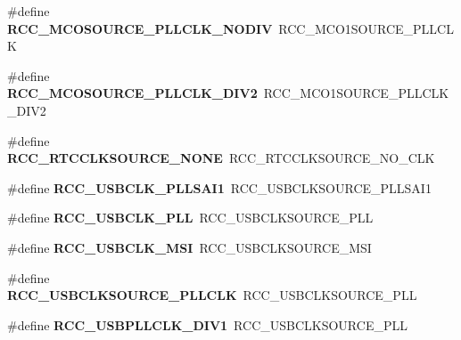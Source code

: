 \begin{DoxyCompactItemize}
\#define {\bfseries R\+C\+C\+\_\+\+M\+C\+O\+S\+O\+U\+R\+C\+E\+\_\+\+P\+L\+L\+C\+L\+K\+\_\+\+N\+O\+D\+IV}~R\+C\+C\+\_\+\+M\+C\+O1\+S\+O\+U\+R\+C\+E\+\_\+\+P\+L\+L\+C\+LK
\item 
\mbox{\label{group___h_a_l___r_c_c___aliased_ga0c689edb9d017b7498258d5e9a9cf5f6}} 
\#define {\bfseries R\+C\+C\+\_\+\+M\+C\+O\+S\+O\+U\+R\+C\+E\+\_\+\+P\+L\+L\+C\+L\+K\+\_\+\+D\+I\+V2}~R\+C\+C\+\_\+\+M\+C\+O1\+S\+O\+U\+R\+C\+E\+\_\+\+P\+L\+L\+C\+L\+K\+\_\+\+D\+I\+V2
\item 
\mbox{\label{group___h_a_l___r_c_c___aliased_ga7ac4762e5f4ebe4a04aea58edc9c46a9}} 
\#define {\bfseries R\+C\+C\+\_\+\+R\+T\+C\+C\+L\+K\+S\+O\+U\+R\+C\+E\+\_\+\+N\+O\+NE}~R\+C\+C\+\_\+\+R\+T\+C\+C\+L\+K\+S\+O\+U\+R\+C\+E\+\_\+\+N\+O\+\_\+\+C\+LK
\item 
\mbox{\label{group___h_a_l___r_c_c___aliased_gad3aae66d6569b04d04517ea523ce6e9e}} 
\#define {\bfseries R\+C\+C\+\_\+\+U\+S\+B\+C\+L\+K\+\_\+\+P\+L\+L\+S\+A\+I1}~R\+C\+C\+\_\+\+U\+S\+B\+C\+L\+K\+S\+O\+U\+R\+C\+E\+\_\+\+P\+L\+L\+S\+A\+I1
\item 
\mbox{\label{group___h_a_l___r_c_c___aliased_ga422c36ab3f01cba07d36c501bf230363}} 
\#define {\bfseries R\+C\+C\+\_\+\+U\+S\+B\+C\+L\+K\+\_\+\+P\+LL}~R\+C\+C\+\_\+\+U\+S\+B\+C\+L\+K\+S\+O\+U\+R\+C\+E\+\_\+\+P\+LL
\item 
\mbox{\label{group___h_a_l___r_c_c___aliased_gab654f9e79c98d6d8edd733ad9606e98f}} 
\#define {\bfseries R\+C\+C\+\_\+\+U\+S\+B\+C\+L\+K\+\_\+\+M\+SI}~R\+C\+C\+\_\+\+U\+S\+B\+C\+L\+K\+S\+O\+U\+R\+C\+E\+\_\+\+M\+SI
\item 
\mbox{\label{group___h_a_l___r_c_c___aliased_ga5e2534f64b47ffdfe41dd2ced073389f}} 
\#define {\bfseries R\+C\+C\+\_\+\+U\+S\+B\+C\+L\+K\+S\+O\+U\+R\+C\+E\+\_\+\+P\+L\+L\+C\+LK}~R\+C\+C\+\_\+\+U\+S\+B\+C\+L\+K\+S\+O\+U\+R\+C\+E\+\_\+\+P\+LL
\item 
\mbox{\label{group___h_a_l___r_c_c___aliased_ga7bc98d6b5187339ea08d38e635b52788}} 
\#define {\bfseries R\+C\+C\+\_\+\+U\+S\+B\+P\+L\+L\+C\+L\+K\+\_\+\+D\+I\+V1}~R\+C\+C\+\_\+\+U\+S\+B\+C\+L\+K\+S\+O\+U\+R\+C\+E\+\_\+\+P\+LL

\end{DoxyCompactItemize}
